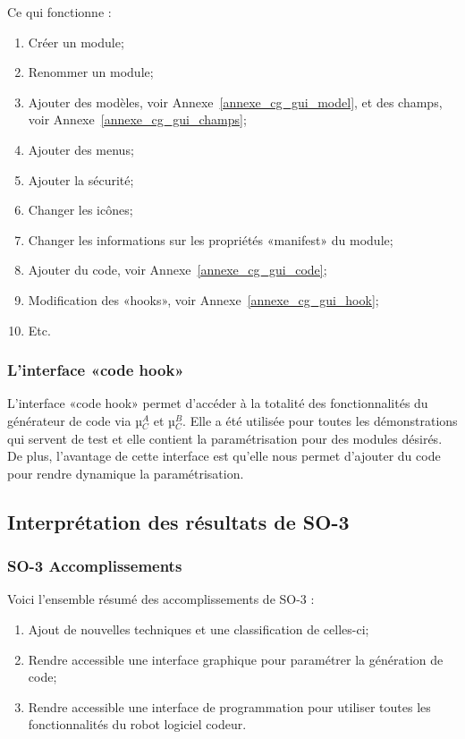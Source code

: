 Ce qui fonctionne : 
\begin{enumerate}
    \item Créer un module;
    \item Renommer un module;
    \item Ajouter des modèles, voir Annexe~\ref{annexe_cg_gui_model}, et des champs, voir Annexe~\ref{annexe_cg_gui_champs};
    \item Ajouter des menus;
    \item Ajouter la sécurité;
    \item Changer les icônes;
    \item Changer les informations sur les propriétés «manifest» du module;
    \item Ajouter du code, voir Annexe~\ref{annexe_cg_gui_code};
    \item Modification des «hooks», voir Annexe~\ref{annexe_cg_gui_hook};
    \item Etc.
\end{enumerate}

\subsubsection{L'interface «code hook»}


L'interface «code hook» permet d’accéder à la totalité des fonctionnalités du générateur de code via µ$_C^A$ et µ$_C^B$. Elle a été utilisée pour toutes les démonstrations qui servent de test et elle contient la paramétrisation pour des modules désirés. De plus, l'avantage de cette interface est qu'elle nous permet d'ajouter du code pour rendre dynamique la paramétrisation.

\subsection{Interprétation des résultats de SO-3}

\subsubsection{SO-3 Accomplissements}
Voici l'ensemble résumé des accomplissements de SO-3 :
\begin{enumerate}
    \item Ajout de nouvelles techniques et une classification de celles-ci;
    \item Rendre accessible une interface graphique pour paramétrer la génération de code;
    \item Rendre accessible une interface de programmation pour utiliser toutes les fonctionnalités du robot logiciel codeur.
\end{enumerate}

